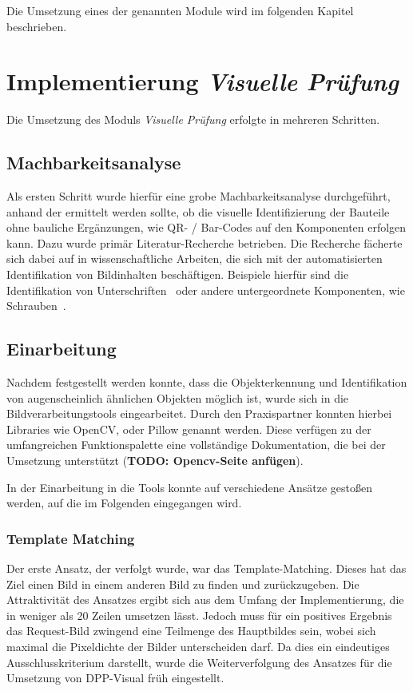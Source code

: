 \documentclass[
    type=Projektarbeit,
    status=draft, %
    language=german, %
    bibengine=bibtex,
]{unibwm-inf-thesis}
\newcommand{\todo}[1]{\textbf{TODO: #1}}
\begin{document}
    Die Umsetzung eines der genannten Module wird im folgenden Kapitel beschrieben.


    \chapter{Implementierung \textit{Visuelle Prüfung}}
    Die Umsetzung des Moduls \textit{Visuelle Prüfung} erfolgte in mehreren Schritten.
    \section{Machbarkeitsanalyse}
    Als ersten Schritt wurde hierfür eine grobe Machbarkeitsanalyse durchgeführt, anhand der ermittelt werden sollte,
    ob die visuelle Identifizierung der Bauteile ohne bauliche Ergänzungen, wie QR- / Bar-Codes auf den Komponenten erfolgen kann.
    Dazu wurde primär Literatur-Recherche betrieben.
    Die Recherche fächerte sich dabei auf in wissenschaftliche Arbeiten, die sich mit der automatisierten Identifikation von Bildinhalten beschäftigen.
    Beispiele hierfür sind die Identifikation von Unterschriften~\citep{Munich2003} oder andere untergeordnete Komponenten, wie Schrauben~\citep{Lehr2019}.

    \section{Einarbeitung}
    Nachdem festgestellt werden konnte, dass die Objekterkennung und Identifikation von augenscheinlich ähnlichen Objekten möglich ist, wurde sich in die Bildverarbeitungstools eingearbeitet.
    Durch den Praxispartner konnten hierbei Libraries wie OpenCV, oder Pillow genannt werden.
    Diese verfügen zu der umfangreichen Funktionspalette eine vollständige Dokumentation, die bei der Umsetzung unterstützt (\todo{Opencv-Seite anfügen}).

    In der Einarbeitung in die Tools konnte auf verschiedene Ansätze gestoßen werden, auf die im Folgenden eingegangen wird.

    \subsection{Template Matching}
    Der erste Ansatz, der verfolgt wurde, war das Template-Matching.
    Dieses hat das Ziel einen Bild in einem anderen Bild zu finden und zurückzugeben.\cite{CV2TemplateMatching2022}
    Die Attraktivität des Ansatzes ergibt sich aus dem Umfang der Implementierung, die in weniger als 20 Zeilen umsetzen lässt.
    Jedoch muss für ein positives Ergebnis das Request-Bild zwingend eine Teilmenge des Hauptbildes sein, wobei sich maximal die Pixeldichte der Bilder unterscheiden darf.
    Da dies ein eindeutiges Ausschlusskriterium darstellt, wurde die Weiterverfolgung des Ansatzes für die Umsetzung von DPP-Visual früh eingestellt.
\end{document}
